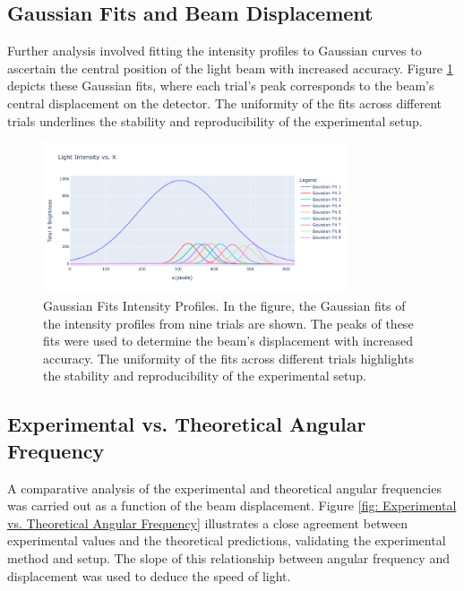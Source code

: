 \documentclass[12pt]{article}
\begin{document}
        \subsection{Gaussian Fits and Beam Displacement}
        Further analysis involved fitting the intensity profiles to Gaussian curves to ascertain the central 
        position of the light beam with increased accuracy. Figure \ref{fig: Gaussian Fits Intensity Profiles} 
        depicts these Gaussian fits, where each trial's peak corresponds to the beam's central displacement 
        on the detector. The uniformity of the fits across different trials underlines the stability and 
        reproducibility of the experimental setup.

        \begin{figure}[!h]
                \centering
                \includegraphics[width=0.80\textwidth]{../Imgs/plot2.png}
                \caption{Gaussian Fits Intensity Profiles. In the figure, the Gaussian fits of the intensity
                profiles from nine trials are shown. The peaks of these fits were used to determine the beam's
                displacement with increased accuracy. The uniformity of the fits across different trials
                highlights the stability and reproducibility of the experimental setup.}
                \label{fig: Gaussian Fits Intensity Profiles}
        \end{figure}
        
        \subsection{Experimental vs. Theoretical Angular Frequency}
        A comparative analysis of the experimental and theoretical angular frequencies was carried out as a 
        function of the beam displacement. Figure \ref{fig: Experimental vs. Theoretical Angular Frequency} illustrates a close agreement between experimental 
        values and the theoretical predictions, validating the experimental method and setup. The slope of 
        this relationship between angular frequency and displacement was used to deduce the speed of light.
\end{document}
